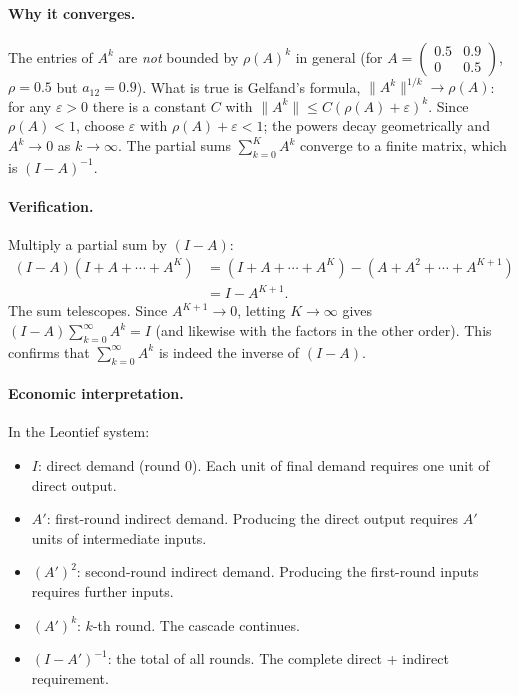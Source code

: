 \documentclass[../structural_economics_book.tex]{subfiles}
\begin{document}
\paragraph{Why it converges.} The entries of $A^k$ are \textit{not} bounded by $\rho(A)^k$ in general (for $A = \begin{pmatrix} 0.5 & 0.9 \\ 0 & 0.5\end{pmatrix}$, $\rho = 0.5$ but $a_{12} = 0.9$). What is true is Gelfand's formula, $\|A^k\|^{1/k} \to \rho(A)$: for any $\varepsilon > 0$ there is a constant $C$ with $\|A^k\| \le C(\rho(A) + \varepsilon)^k$. Since $\rho(A) < 1$, choose $\varepsilon$ with $\rho(A) + \varepsilon < 1$; the powers decay geometrically and $A^k \to 0$ as $k \to \infty$. The partial sums $\sum_{k=0}^K A^k$ converge to a finite matrix, which is $(I - A)^{-1}$.

\paragraph{Verification.} Multiply a partial sum by $(I - A)$:
\begin{align}
(I - A)(I + A + \cdots + A^K) &= (I + A + \cdots + A^K) - (A + A^2 + \cdots + A^{K+1}) \\
&= I - A^{K+1}.
\end{align}
The sum telescopes. Since $A^{K+1} \to 0$, letting $K \to \infty$ gives $(I - A)\sum_{k=0}^\infty A^k = I$ (and likewise with the factors in the other order). This confirms that $\sum_{k=0}^\infty A^k$ is indeed the inverse of $(I - A)$.

\paragraph{Economic interpretation.} In the Leontief system:
\begin{itemize}
\item $I$: direct demand (round 0). Each unit of final demand requires one unit of direct output.
\item $A'$: first-round indirect demand. Producing the direct output requires $A'$ units of intermediate inputs.
\item $(A')^2$: second-round indirect demand. Producing the first-round inputs requires further inputs.
\item $(A')^k$: $k$-th round. The cascade continues.
\item $(I - A')^{-1}$: the total of all rounds. The complete direct + indirect requirement.
\end{itemize}
\end{document}
